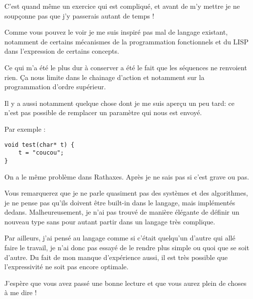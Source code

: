 \documentclass{rtxreport}
\begin{document}
C’est quand même un exercice qui est compliqué, et avant de m’y mettre je ne
soupçonne pas que j’y passerais autant de temps !

Comme vous pouvez le voir je me suis inspiré pas mal de langage existant,
notamment de certains mécanismes de la programmation fonctionnels et du LISP
dans l’expression de certains concepts.

Ce qui m’a été le plus dur à conserver a été le fait que les séquences ne
renvoient rien. Ça nous limite dans le chainage d’action et notamment sur la
programmation d’ordre supérieur.

Il y a aussi notamment quelque chose dont je me suis aperçu un peu tard: ce
n’est pas possible de remplacer un paramètre qui nous est envoyé.

Par exemple :
\lstset{language=C}
\begin{lstlisting}
void test(char* t) {
	t = "coucou";
}
\end{lstlisting}


On a le même problème dans Rathaxes. Après je ne sais pas si c’est grave ou pas.

Vous remarquerez que je ne parle quasiment pas des systèmes et des algorithmes,
je ne pense pas qu’ils doivent être built-in dans le langage, mais implémentés
dedans. Malheureusement, je n’ai pas trouvé de manière élégante de définir un
nouveau type sans pour autant partir dans un langage très complique.

Par ailleurs, j’ai pensé au langage comme si c’était quelqu’un d’autre qui allé
faire le travail, je n’ai donc pas essayé de le rendre plus simple ou quoi que
se soit d’autre. Du fait de mon manque d’expérience aussi, il est très possible
que l’expressivité ne soit pas encore optimale.

J’espère que vous avez passé une bonne lecture et que vous aurez plein de choses
à me dire !
\end{document}
